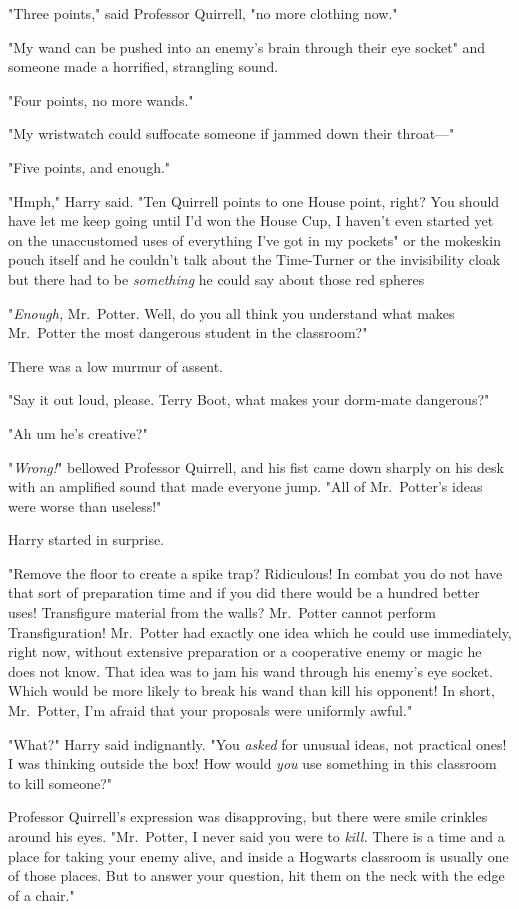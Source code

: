"Three points," said Professor Quirrell, "no more clothing now."

"My wand can be pushed into an enemy's brain through their eye socket" and
someone made a horrified, strangling sound.

"Four points, no more wands."

"My wristwatch could suffocate someone if jammed down their throat---"

"Five points, and enough."

"Hmph," Harry said. "Ten Quirrell points to one House point, right? You should
have let me keep going until I'd won the House Cup, I haven't even started yet
on the unaccustomed uses of everything I've got in my pockets" or the mokeskin
pouch itself and he couldn't talk about the Time-Turner or the invisibility
cloak but there had to be \emph{something} he could say about those red
spheres{\el}

"\emph{Enough,} Mr.~Potter. Well, do you all think you understand what makes
Mr.~Potter the most dangerous student in the classroom?"

There was a low murmur of assent.

"Say it out loud, please. Terry Boot, what makes your dorm-mate dangerous?"

"Ah{\el} um{\el} he's creative?"

"\emph{Wrong!}" bellowed Professor Quirrell, and his fist came down sharply on
his desk with an amplified sound that made everyone jump. "All of Mr.~Potter's
ideas were worse than useless!"

Harry started in surprise.

"Remove the floor to create a spike trap? Ridiculous! In combat you do not have
that sort of preparation time and if you did there would be a hundred better
uses! Transfigure material from the walls? Mr.~Potter cannot perform
Transfiguration! Mr.~Potter had exactly one idea which he could use
immediately, right now, without extensive preparation or a cooperative enemy or
magic he does not know. That idea was to jam his wand through his enemy's eye
socket. Which would be more likely to break his wand than kill his opponent! In
short, Mr.~Potter, I'm afraid that your proposals were uniformly awful."

"What?" Harry said indignantly. "You \emph{asked} for unusual ideas, not
practical ones! I was thinking outside the box! How would \emph{you} use
something in this classroom to kill someone?"

Professor Quirrell's expression was disapproving, but there were smile crinkles
around his eyes. "Mr.~Potter, I never said you were to \emph{kill.} There is a
time and a place for taking your enemy alive, and inside a Hogwarts classroom
is usually one of those places. But to answer your question, hit them on the
neck with the edge of a chair."

